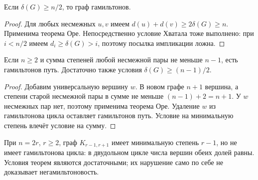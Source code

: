 \begin{theorem}[Дирак]
Если \(\delta(G)\ge n/2\), то граф гамильтонов.
\end{theorem}
\begin{proof}
Для любых несмежных \(u,v\) имеем \(d(u)+d(v)\ge2\delta(G)\ge n\).
Применима теорема Оре. Непосредственно условие Хватала тоже выполнено:
при \(i<n/2\) имеем \(d_i\ge\delta(G)>i\), поэтому посылка импликации ложна.
\end{proof}
\begin{cor}
Если \(n\ge2\) и сумма степеней любой несмежной пары не меньше \(n-1\),
есть гамильтонов путь. Достаточно также условия \(\delta(G)\ge(n-1)/2\).
\end{cor}
\begin{proof}
Добавим универсальную вершину \(w\). В новом графе \(n+1\) вершина,
а степени старой несмежной пары в сумме не меньше \((n-1)+2=n+1\).
У \(w\) несмежных пар нет, поэтому применима теорема Оре.
Удаление \(w\) из гамильтонова цикла оставляет гамильтонов путь.
Условие на минимальную степень влечёт условие на сумму.
\end{proof}
\begin{example}
При \(n=2r\), \(r\ge2\), граф \(K_{r-1,r+1}\) имеет минимальную степень
\(r-1\), но не имеет гамильтонова цикла: в двудольном цикле числа
вершин обеих долей равны. Условия теорем являются достаточными;
их нарушение само по себе не доказывает негамильтоновость.
\end{example}
